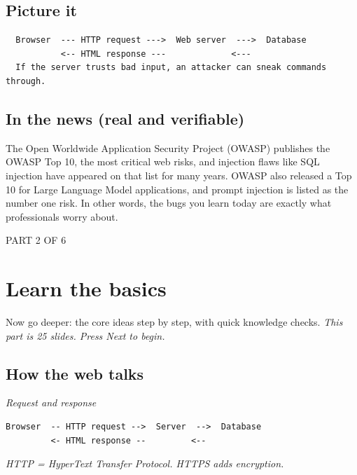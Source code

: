 \documentclass[12pt,openany]{book}
\begin{document}
\medskip

\subsection*{Picture it}


\begin{lstlisting}
  Browser  --- HTTP request --->  Web server  --->  Database
           <-- HTML response ---             <---
  If the server trusts bad input, an attacker can sneak commands through.
\end{lstlisting}

\medskip

\subsection*{In the news (real and verifiable)}


The Open Worldwide Application Security Project (OWASP) publishes the OWASP Top 10, the most critical web risks, and injection flaws like SQL injection have appeared on that list for many years. OWASP also released a Top 10 for Large Language Model applications, and prompt injection is listed as the number one risk. In other words, the bugs you learn today are exactly what professionals worry about.

\medskip

\vspace{4pt}\noindent\textsc{PART 2 OF 6}


\section*{Learn the basics}

Now go deeper: the core ideas step by step, with quick knowledge checks.
{\small\itshape\color{gray}This part is 25 slides. Press Next to begin.}

\medskip

\subsection*{How the web talks}
{\small\itshape\color{gray}Request and response}


\begin{lstlisting}
Browser  -- HTTP request -->  Server  -->  Database
         <- HTML response --         <--\end{lstlisting}
{\small\itshape\color{gray}HTTP = HyperText Transfer Protocol. HTTPS adds encryption.}
\end{document}
